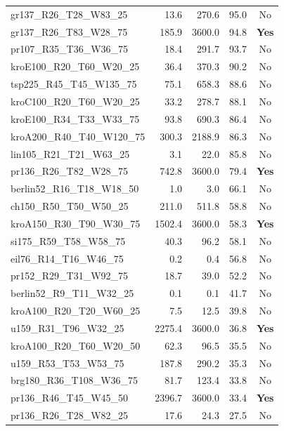 \documentclass{singlecol-new}
\theoremstyle{TH}{
\newtheorem{lemma}{Lemma}
\newtheorem{theorem}[lemma]{Theorem}
\newtheorem{corrolary}[lemma]{Corrolary}
\newtheorem{conjecture}[lemma]{Conjecture}
\newtheorem{proposition}[lemma]{Proposition}
\newtheorem{claim}[lemma]{Claim}
\newtheorem{stheorem}[lemma]{Wrong Theorem}
}
\theoremstyle{THrm}{
\newtheorem{definition}{Definition}[section]
\newtheorem{question}{Question}[section]
\newtheorem{remark}{Remark}
\newtheorem{scheme}{Scheme}
}
\theoremstyle{THhit}{
\newtheorem{case}{Case}[section]
}
\begin{document}
\begin{table}[h]
{\begin{tabular}{l@{\hspace{0.4\tabcolsep}}r@{\hspace{0.4\tabcolsep}}r@{\hspace{0.4\tabcolsep}}r@{\hspace{0.4\tabcolsep}}c}
		gr137\_R26\_T28\_W83\_25    & 13.6   & 270.6  & 95.0 & No           \\
		gr137\_R26\_T83\_W28\_75    & 185.9  & 3600.0 & 94.8 & \textbf{Yes} \\
		pr107\_R35\_T36\_W36\_75    & 18.4   & 291.7  & 93.7 & No           \\
		kroE100\_R20\_T60\_W20\_25  & 36.4   & 370.3  & 90.2 & No           \\
		tsp225\_R45\_T45\_W135\_75  & 75.1   & 658.3  & 88.6 & No           \\
		kroC100\_R20\_T60\_W20\_25  & 33.2   & 278.7  & 88.1 & No           \\
		kroE100\_R34\_T33\_W33\_75  & 93.8   & 690.3  & 86.4 & No           \\
		kroA200\_R40\_T40\_W120\_75 & 300.3  & 2188.9 & 86.3 & No           \\
		lin105\_R21\_T21\_W63\_25   & 3.1    & 22.0   & 85.8 & No           \\
		pr136\_R26\_T82\_W28\_75    & 742.8  & 3600.0 & 79.4 & \textbf{Yes} \\
		berlin52\_R16\_T18\_W18\_50 & 1.0    & 3.0    & 66.1 & No           \\
		ch150\_R50\_T50\_W50\_25    & 211.0  & 511.8  & 58.8 & No           \\
		kroA150\_R30\_T90\_W30\_75  & 1502.4 & 3600.0 & 58.3 & \textbf{Yes} \\
		si175\_R59\_T58\_W58\_75    & 40.3   & 96.2   & 58.1 & No           \\
		eil76\_R14\_T16\_W46\_75    & 0.2    & 0.4    & 56.8 & No           \\
		pr152\_R29\_T31\_W92\_75    & 18.7   & 39.0   & 52.2 & No           \\
		berlin52\_R9\_T11\_W32\_25  & 0.1    & 0.1    & 41.7 & No           \\
		kroA100\_R20\_T20\_W60\_25  & 7.5    & 12.5   & 39.8 & No           \\
		u159\_R31\_T96\_W32\_25     & 2275.4 & 3600.0 & 36.8 & \textbf{Yes} \\
		kroA100\_R20\_T60\_W20\_50  & 62.3   & 96.5   & 35.5 & No           \\
		u159\_R53\_T53\_W53\_75     & 187.8  & 290.2  & 35.3 & No           \\
		brg180\_R36\_T108\_W36\_75  & 81.7   & 123.4  & 33.8 & No           \\
		pr136\_R46\_T45\_W45\_50    & 2396.7 & 3600.0 & 33.4 & \textbf{Yes} \\
		pr136\_R26\_T28\_W82\_25    & 17.6   & 24.3   & 27.5 & No           \\

\end{tabular}}
\end{table}
\end{document}
